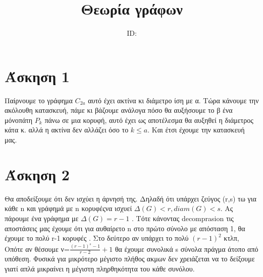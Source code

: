 \documentclass{article}
\title{Θεωρία γράφων \\ \exerciseset}
\author{\studentname \qquad  ID: \suid}
\begin{document}
\maketitle
\section*{Άσκηση 1}
	Παίρνουμε το γράφημα $C_{2a}$ αυτό έχει ακτίνα  κι διάμετρο ίση με α. Τώρα κάνουμε την ακόλουθη κατασκευή, πάμε κι βάζουμε ανάλογα πόσο θα αυξήσουμε το β ένα μόνοπάτη $P_k$ πάνω σε μια κορυφή, αυτό έχει ως αποτέλεσμα θα αυξηθεί η διάμετρος κάτα κ. αλλά η ακτίνα δεν αλλάζει όσο το $k \le a$. Και έτσι έχουμε την κατασκευή μας.
	\section*{Άσκηση 2}
	Θα αποδείξουμε ότι δεν ισχύει η άρνησή της. Δηλαδή ότι υπάρχει ζεύγος (r,s) τω για κάθε n και γράφημά με n κορυφέςνα ισχυεί $\Delta(G)<r ,diam(G)<s$. Ας πάρουμε ένα γράφημα με $\Delta(G)=r-1$ . Τότε κάνοντας decomprasion τις αποστάσεις μας έχουμε ότι για αυθαίρετο n στο πρώτο σύνολο με απόσταση 1, θα έχουμε το πολύ r-1 κορυφές . Στο δεύτερο αν υπάρχει το πολύ $(r-1)^2$ κτλπ, Οπότε αν θέσουμε ν=$\frac{(r-1)^s-1}{r-2} +1$ θα έχουμε συνολικά s σύνολα πράγμα άτοπο από υπόθεση. Φυσικά για μικρότερο μέγιστο πλήθος ακμων δεν χρειάζεται να το δείξουμε γιατί απλά μικραίνει η μέγιστη πληρθηκότητα του κάθε συνόλου.
\end{document}
